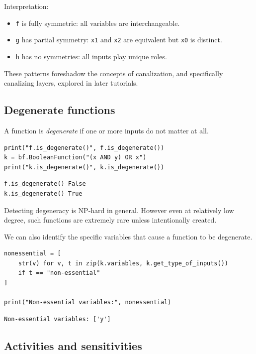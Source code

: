 \documentclass[
]{article}
\newcounter{none} %
\providecommand{\tightlist}{%
  \setlength{\itemsep}{0pt}\setlength{\parskip}{0pt}}
\begin{document}
Interpretation:

\begin{itemize}
\tightlist
\item
  \texttt{f} is fully symmetric: all variables are interchangeable.
\item
  \texttt{g} has partial symmetry: \texttt{x1} and \texttt{x2} are
  equivalent but \texttt{x0} is distinct.
\item
  \texttt{h} has no symmetries: all inputs play unique roles.
\end{itemize}

These patterns foreshadow the concepts of canalization, and specifically
canalizing layers, explored in later tutorials.

\subsection{Degenerate functions}\label{degenerate-functions}

A function is \emph{degenerate} if one or more inputs do not matter at
all.

\begin{lstlisting}
print("f.is_degenerate()", f.is_degenerate())
k = bf.BooleanFunction("(x AND y) OR x")
print("k.is_degenerate()", k.is_degenerate())
\end{lstlisting}

\begin{lstlisting}
f.is_degenerate() False
k.is_degenerate() True
\end{lstlisting}

Detecting degeneracy is NP-hard in general. However even at relatively
low degree, such functions are extremely rare unless intentionally
created.

We can also identify the specific variables that cause a function to be
degenerate.

\begin{lstlisting}
nonessential = [
    str(v) for v, t in zip(k.variables, k.get_type_of_inputs())
    if t == "non-essential"
]

print("Non-essential variables:", nonessential)
\end{lstlisting}

\begin{lstlisting}
Non-essential variables: ['y']
\end{lstlisting}

\subsection{Activities and
sensitivities}\label{activities-and-sensitivities}
\end{document}
